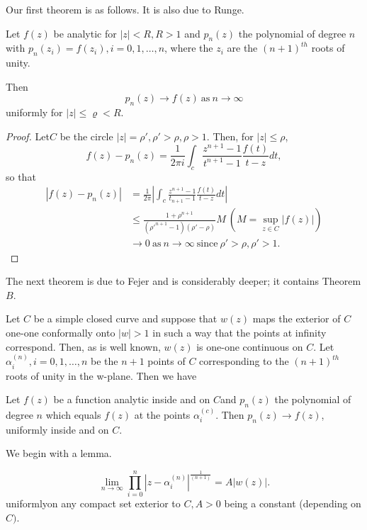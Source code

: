 Our first theorem is as follows. It is also due to Runge. 

\begin{Thm*}[{\bf B}] %
  Let $f(z)$ be analytic for $|z| <  R, R> 1$  and $p_n(z)$ the
  polynomial of degree $n$ with $p_n(z_i) = f(z_i), i=0, 1, \ldots, 
  n$, where the $z_i$ are the $(n+1)^{th}$ roots of unity. 
 
  Then
  $$
  p_n(z) \to f(z) ~\text{as}~ n \to \infty
  $$
  uniformly for $|z| \le \varrho <R$.
\end{Thm*}

\begin{proof}
  Let\pageoriginale $C$ be the circle $ | z |= \rho', \rho'> \rho, \rho>1$. Then,
  for $|z| \le \rho$, 
  $$
  f(z)-p_n(z)= \frac{1}{2 \pi i} \int_c \frac{z^{n+1}-1}{t^{n+1}-1}
  \frac{f(t)}{t-z}dt, 
  $$
  so that
  \begin{align*}
    |f(z)- p_n(z) | &=  \frac{1}{2 \pi} | \int_c
    \frac{z^{n+1}-1}{t_{n+1}-1}  \frac{f(t)}{t-z} dt | \\ 
    &\le  \frac{1+ \rho^{n+1}}{(\rho'^{n+1}-1)(\rho'- \rho)} M~
    (M=\sup_{z \in C} |f (z)|) \\ 
    & \to  0 ~\text{as}~ n  \to \infty ~\text{since}~ \rho' > \rho, \rho'>1.
  \end{align*}
\end{proof}

The next theorem is due to Fejer and is considerably deeper; it
contains Theorem $B$. 

Let $C$ be a simple closed curve and suppose that $w(z)$ maps the
exterior of $C$ one-one conformally onto $| w|> 1$ in such a way that
the points at infinity correspond. Then, as is well known, $w(z)$ is
one-one continuous on $C$. Let $\alpha^{(n)}_i, i=0, 1,\ldots, n$ be the
$n+1$  points of $C$ corresponding to the $(n+1)^{th}$ roots of unity
in the  w-plane. Then we have 

\begin{Thm*}[{\bf C}]%
  Let $f(z)$ be a function analytic inside and on $C$and $p_n(z)$ the
  polynomial of degree $n$ which equals $f(z)$ at the points
  $\alpha^{(c)}_i$. Then $p_n (z) \to f(z)$, uniformly inside and on $C$. 
\end{Thm*}

We begin with a lemma.
\begin{lemma*}
  $$
  \lim_{n \to \infty} \prod^n_{i=0} \left| z-
  \alpha^{(n)}_i\right|^{\frac{1}{(n+1)}} = A | w(z) |.  
  $$
  uniformly\pageoriginale on any compact set exterior to $C, A > 0$ being a constant
  (depending on $C)$. 
\end{lemma*}

